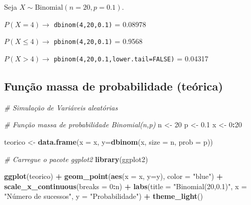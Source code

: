 \documentclass[
]{book}
\newenvironment{Shaded}{\begin{snugshade}}{\end{snugshade}}
\newcommand{\AttributeTok}[1]{\textcolor[rgb]{0.13,0.29,0.53}{#1}}
\newcommand{\CommentTok}[1]{\textcolor[rgb]{0.56,0.35,0.01}{\textit{#1}}}
\newcommand{\DecValTok}[1]{\textcolor[rgb]{0.00,0.00,0.81}{#1}}
\newcommand{\FloatTok}[1]{\textcolor[rgb]{0.00,0.00,0.81}{#1}}
\newcommand{\FunctionTok}[1]{\textcolor[rgb]{0.13,0.29,0.53}{\textbf{#1}}}
\newcommand{\NormalTok}[1]{#1}
\newcommand{\OtherTok}[1]{\textcolor[rgb]{0.56,0.35,0.01}{#1}}
\newcommand{\SpecialCharTok}[1]{\textcolor[rgb]{0.81,0.36,0.00}{\textbf{#1}}}
\newcommand{\StringTok}[1]{\textcolor[rgb]{0.31,0.60,0.02}{#1}}
\theoremstyle{definition}
\theoremstyle{definition}
\theoremstyle{definition}
\theoremstyle{definition}
\theoremstyle{remark}
\begin{document}
Seja \(X\sim \text{Binomial}(n=20,p=0.1)\).

\(P(X = 4) \to\) \texttt{dbinom(4,20,0.1)} = 0.08978

\(P(X \leq 4) \to\) \texttt{pbinom(4,20,0.1)} = 0.9568

\(P(X > 4)\to\) \texttt{pbinom(4,20,0.1,lower.tail=FALSE)} = 0.04317

\subsection{Função massa de probabilidade (teórica)}\label{funuxe7uxe3o-massa-de-probabilidade-teuxf3rica}

\begin{Shaded}
\begin{Highlighting}[]
\CommentTok{\# Simulação de Variáveis aleatórias}

\CommentTok{\# Função massa de probabilidade Binomial(n,p)}
\NormalTok{n }\OtherTok{\textless{}{-}} \DecValTok{20}
\NormalTok{p }\OtherTok{\textless{}{-}} \FloatTok{0.1}
\NormalTok{x }\OtherTok{\textless{}{-}} \DecValTok{0}\SpecialCharTok{:}\DecValTok{20}

\NormalTok{teorico }\OtherTok{\textless{}{-}} \FunctionTok{data.frame}\NormalTok{(}\AttributeTok{x =}\NormalTok{ x, }\AttributeTok{y=}\FunctionTok{dbinom}\NormalTok{(x, }\AttributeTok{size =}\NormalTok{ n, }\AttributeTok{prob =}\NormalTok{ p))}

\CommentTok{\# Carregue o pacote ggplot2}
\FunctionTok{library}\NormalTok{(ggplot2)}

\FunctionTok{ggplot}\NormalTok{(teorico) }\SpecialCharTok{+}  
  \FunctionTok{geom\_point}\NormalTok{(}\FunctionTok{aes}\NormalTok{(}\AttributeTok{x =}\NormalTok{ x, }\AttributeTok{y=}\NormalTok{y), }\AttributeTok{color =} \StringTok{"blue"}\NormalTok{) }\SpecialCharTok{+} 
  \FunctionTok{scale\_x\_continuous}\NormalTok{(}\AttributeTok{breaks =} \DecValTok{0}\SpecialCharTok{:}\NormalTok{n) }\SpecialCharTok{+}  
  \FunctionTok{labs}\NormalTok{(}\AttributeTok{title =} \StringTok{"Binomial(20,0.1)"}\NormalTok{, }\AttributeTok{x =} \StringTok{"Número de sucessos"}\NormalTok{, }\AttributeTok{y =} \StringTok{"Probabilidade"}\NormalTok{) }\SpecialCharTok{+}  
  \FunctionTok{theme\_light}\NormalTok{()}
\end{Highlighting}
\end{Shaded}
\end{document}
